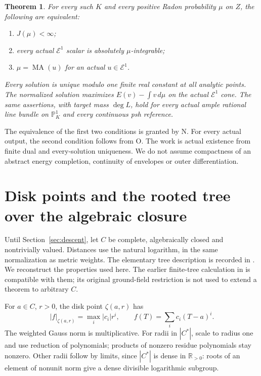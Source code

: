 \documentclass[11pt]{article}
\newtheorem{theorem}{Theorem}
\newcommand{\MA}{\operatorname{MA}}
\newcommand{\E}{\mathcal E}
\begin{document}
\begin{theorem}\label{thm:main}
For every such $K$ and every positive Radon probability $\mu$ on
$Z$, the following are equivalent:
\begin{enumerate}
\item $J(\mu)<\infty$;
\item every actual $\E^1$ scalar is absolutely $\mu$-integrable;
\item $\mu=\MA(u)$ for an actual $u\in\E^1$.
\end{enumerate}
Every solution is unique modulo one finite real constant at
\emph{all} analytic points. The normalized solution maximizes
$E(v)-\int v\,d\mu$ on the actual $\E^1$ cone. The same assertions,
with target mass $\deg L$, hold for every actual ample rational
line bundle on $\mathbb P^1_K$ and every continuous psh reference.
\end{theorem}

The equivalence of the first two conditions is granted by N.
For every actual output, the second condition follows from O.
The work is actual existence from finite dual and every-solution
uniqueness. We do not assume compactness of an abstract energy
completion, continuity of envelopes or outer differentiation.

\section{Disk points and the rooted tree over the algebraic closure}

Until Section~\ref{sec:descent}, let $C$ be complete, algebraically
closed and nontrivially valued. Distances use the natural logarithm,
in the same normalization as metric weights. The elementary tree
description is recorded in \cite[Sections 1.3--1.6 and 2.2]{AWS}.
We reconstruct the properties used here. The earlier finite-tree
calculation in \cite[Sections 3.2--3.3]{BR} is compatible with them;
its original ground-field restriction is not used to extend a
theorem to arbitrary $C$.

For $a\in C$, $r>0$, the disk point $\zeta(a,r)$ has
\[
 |f|_{\zeta(a,r)}=\max_i|c_i|r^i,
 \qquad f(T)=\sum_i c_i(T-a)^i.
\]
The weighted Gauss norm is multiplicative. For radii in $|C^*|$,
scale to radius one and use reduction of polynomials; products of
nonzero residue polynomials stay nonzero. Other radii follow by
limits, since $|C^*|$ is dense in $\mathbb R_{>0}$: roots of an
element of nonunit norm give a dense divisible logarithmic subgroup.
\end{document}
